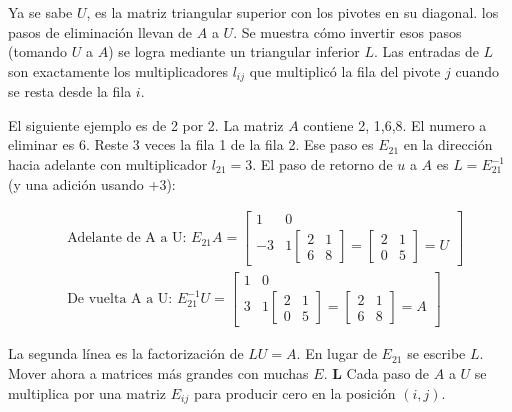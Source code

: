 Ya se sabe $U$, es la matriz triangular superior con los pivotes en su diagonal. los
pasos de eliminación llevan de $A$ a $U$. Se muestra cómo invertir esos pasos (tomando $U$
a $A$) se logra mediante un triangular inferior $L$. Las entradas de $L$ son exactamente los multiplicadores
$l_{ij}$ que multiplicó la fila del pivote $j$ cuando se resta desde la fila $i$.

El siguiente ejemplo es de 2 por 2. La matriz $A$ contiene 2, 1,6,8. El numero a eliminar
es 6. Reste 3 veces la fila 1 de la fila 2. Ese paso es $E_{21}$ en la dirección hacia adelante con
multiplicador $l_{21} = 3$. El paso de retorno de $u$ a $A$ es $L = E^{-1}_{21}$ (y una adición usando +3):

\begin{example}
	\begin{align*}
		 & \text{Adelante de A a U: } E_{21}A=\begin{bmatrix}
			                                      1 & 0 \\-3&1\begin{bmatrix}
				2 & 1 \\6&8
			\end{bmatrix}=\begin{bmatrix}
				2 & 1 \\0&5
			\end{bmatrix}=U
		                                      \end{bmatrix}   \\
		 & \text{De vuelta A a U: } E^{-1}_{21}U=\begin{bmatrix}
			                                         1 & 0 \\3&1\begin{bmatrix}
				2 & 1 \\0&5
			\end{bmatrix}=\begin{bmatrix}
				2 & 1 \\6&8
			\end{bmatrix}=A
		                                         \end{bmatrix}
	\end{align*}
\end{example}

La segunda línea es la factorización de $LU = A$. En lugar de $E_{21}$ se escribe $L$. Mover ahora a
matrices más grandes con muchas $E$. \textbf{L}
Cada paso de $A$ a $U$ se multiplica por una matriz $E_{ij}$
para producir cero en la posición $(i, j)$.

